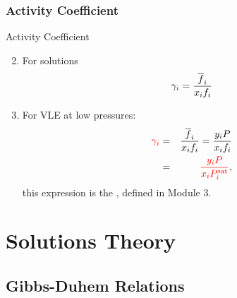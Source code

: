 \documentclass[10pt,compress,unknownkeysallowed]{beamer}
\begin{document}
\begin{frame}
  \frametitle{Activity Coefficient}
       \begin{block}{\begin{center}\normalsize{ Activity Coefficient}\end{center}}
            \begin{enumerate}\setcounter{enumi}{1}  
               \item<1-> For solutions
                  \begin{displaymath}
                     \gamma_{i} = \displaystyle\frac{\overline{f}_{i}}{x_{i}f_{i}}
                  \end{displaymath}
               \item<2-> For VLE at low pressures:
                  \begin{eqnarray}
                      \textcolor{red}{\gamma_{i}} &=& \displaystyle\frac{\overline{f}_{i}}{x_{i}f_{i}} = \displaystyle\frac{y_{i}P}{x_{i}f_{i}} \nonumber \\
                                        &=&  \textcolor{red}{\displaystyle\frac{y_{i}P}{x_{i}P_{i}^{\text{sat}}}}, \nonumber
                  \end{eqnarray}
                  this expression is the , defined in Module 3.
             \end{enumerate}
        \end{block}
         
\end{frame}
\normalsize


\section{Solutions Theory}

\subsection{Gibbs-Duhem Relations}
\end{document}

